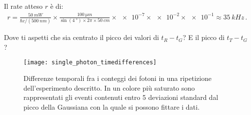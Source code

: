 \documentclass[a4paper,12pt]{article}
\begin{document}
Il rate atteso \(r\) è di:
%
\begin{align}
r = \frac{\SI{50}{mW}}{\hbar c / (\SI{500}{nm})}
\times 
\frac{\SI{100}{\micro m}}{\sin(\SI{4}{\degree}) \times 2 \pi  \times \SI{50}{cm}}
\times \num{e-7} \times \num{e-2} \times \num{e-1} \approx \SI{35}{kHz} 
\,.
\end{align}
%


\begin{exo}
    Dove ti aspetti che sia centrato il picco dei valori di \(t_R - t_G\)? E il picco di \(t_T - t_G\)? 
\end{exo}

\begin{figure}[ht]
\centering
\texttt{[image: single\_photon\_timedifferences]}
\caption{Differenze temporali fra i conteggi dei fotoni in una ripetizione dell'esperimento descritto. In un colore più saturato sono rappresentati gli eventi contenuti entro 5 deviazioni standard dal picco della Gaussiana con la quale si possono fittare i dati.}
\label{fig:single_photon_timedifferences}
\end{figure}

\printbibliography
\end{document}
